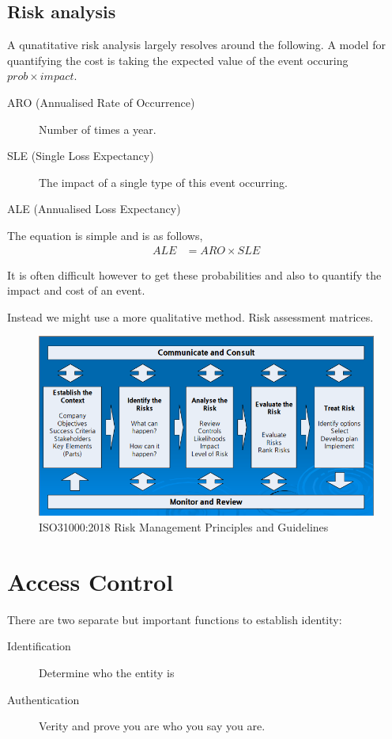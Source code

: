 \documentclass{report}
\begin{document}
\section{Risk analysis}
A qunatitative risk analysis largely resolves around the following.
A model for quantifying the cost is taking the expected value of the
event occuring $prob \times impact$.

\begin{description}
    \item [ARO (Annualised Rate of Occurrence)] Number of times a year.

    \item [SLE (Single Loss Expectancy)]
        The impact of a single type of this event occurring.

    \item [ALE (Annualised Loss Expectancy)]
\end{description}

The equation is simple and is as follows,
\begin{align*}
    ALE &= ARO \times SLE
\end{align*}

It is often difficult however to get these probabilities and also to
quantify the impact and cost of an event.

Instead we might use a more qualitative method.
Risk assessment matrices.

\begin{figure}[h]
    \centering
    \includegraphics[width=\textwidth]{images/standards-flow.png}
    \caption{ISO31000:2018 Risk Management Principles and Guidelines}
\end{figure}

\chapter{Access Control}
There are two separate but important functions to establish identity:
\begin{description}
    \item [Identification] Determine who the entity is
    \item [Authentication] Verity and prove you are who you say you are.
\end{description}
\end{document}
